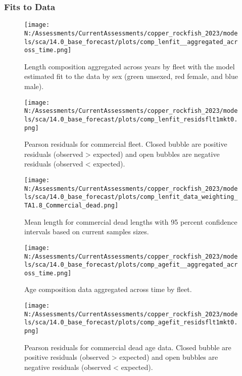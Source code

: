 \documentclass[11pt,
  english,
  letterpaper,
]{article}
\begin{document}
\newpage

\hypertarget{fits-to-data}{%
\subsubsection{Fits to Data}\label{fits-to-data}}

\begin{figure}
\centering
\texttt{[image: N:/Assessments/CurrentAssessments/copper\_rockfish\_2023/models/sca/14.0\_base\_forecast/plots/comp\_lenfit\_\_aggregated\_across\_time.png]}
\caption{Length composition aggregated across years by fleet with the model estimated fit to the data by sex (green unsexed, red female, and blue male).\label{fig:len-agg-fit}}
\end{figure}

\pagebreak

\begin{figure}
\centering
\texttt{[image: N:/Assessments/CurrentAssessments/copper\_rockfish\_2023/models/sca/14.0\_base\_forecast/plots/comp\_lenfit\_residsflt1mkt0.png]}
\caption{Pearson residuals for commercial fleet. Closed bubble are positive residuals (observed \textgreater{} expected) and open bubbles are negative residuals (observed \textless{} expected).\label{fig:com-dead-pearson}}
\end{figure}

\pagebreak

\begin{figure}
\centering
\texttt{[image: N:/Assessments/CurrentAssessments/copper\_rockfish\_2023/models/sca/14.0\_base\_forecast/plots/comp\_lenfit\_data\_weighting\_TA1.8\_Commercial\_dead.png]}
\caption{Mean length for commercial dead lengths with 95 percent confidence intervals based on current samples sizes.\label{fig:com-dead-mean-len-fit}}
\end{figure}

\pagebreak

\begin{figure}
\centering
\texttt{[image: N:/Assessments/CurrentAssessments/copper\_rockfish\_2023/models/sca/14.0\_base\_forecast/plots/comp\_agefit\_\_aggregated\_across\_time.png]}
\caption{Age composition data aggregated across time by fleet.\label{fig:agg-marg-age-fit}}
\end{figure}

\pagebreak

\begin{figure}
\centering
\texttt{[image: N:/Assessments/CurrentAssessments/copper\_rockfish\_2023/models/sca/14.0\_base\_forecast/plots/comp\_agefit\_residsflt1mkt0.png]}
\caption{Pearson residuals for commercial dead age data. Closed bubble are positive residuals (observed \textgreater{} expected) and open bubbles are negative residuals (observed \textless{} expected).\label{fig:com-dead-age-pearson}}
\end{figure}
\end{document}
